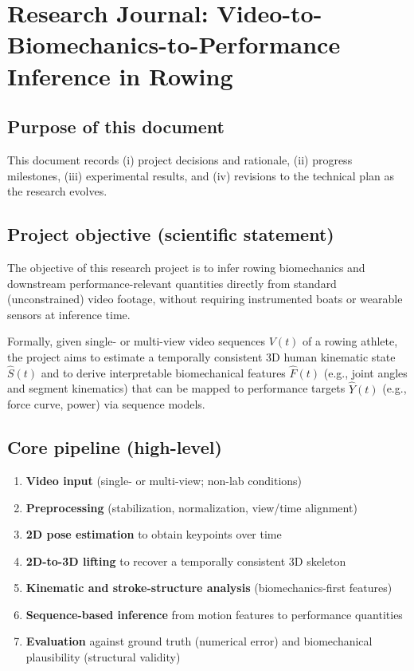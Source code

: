 \documentclass[11pt]{article}
\begin{document}
\section*{Research Journal: Video-to-Biomechanics-to-Performance Inference in Rowing}

\subsection*{Purpose of this document}
This document records (i) project decisions and rationale, (ii) progress milestones, (iii) experimental results, and (iv) revisions to the technical plan as the research evolves.

\subsection*{Project objective (scientific statement)}
The objective of this research project is to infer rowing biomechanics and downstream performance-relevant quantities directly from standard (unconstrained) video footage, without requiring instrumented boats or wearable sensors at inference time.

Formally, given single- or multi-view video sequences $V(t)$ of a rowing athlete, the project aims to estimate a temporally consistent 3D human kinematic state $\hat{S}(t)$ and to derive interpretable biomechanical features $\hat{F}(t)$ (e.g., joint angles and segment kinematics) that can be mapped to performance targets $\hat{Y}(t)$ (e.g., force curve, power) via sequence models.

\subsection*{Core pipeline (high-level)}
\begin{enumerate}
  \item \textbf{Video input} (single- or multi-view; non-lab conditions)
  \item \textbf{Preprocessing} (stabilization, normalization, view/time alignment)
  \item \textbf{2D pose estimation} to obtain keypoints over time
  \item \textbf{2D-to-3D lifting} to recover a temporally consistent 3D skeleton
  \item \textbf{Kinematic and stroke-structure analysis} (biomechanics-first features)
  \item \textbf{Sequence-based inference} from motion features to performance quantities
  \item \textbf{Evaluation} against ground truth (numerical error) and biomechanical plausibility (structural validity)
\end{enumerate}
\end{document}
